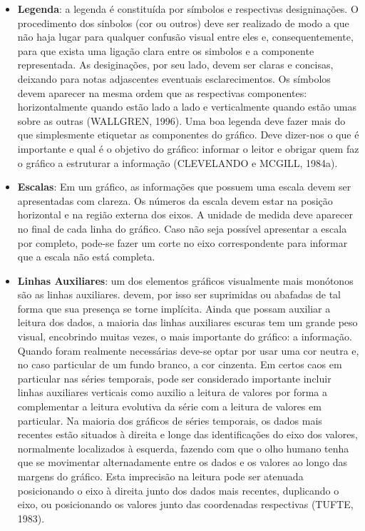 \begin{itemize}
\item \textbf{Legenda}: a legenda é constituída por símbolos e respectivas designinações. O procedimento dos sinbolos (cor ou outros) deve ser realizado de modo a que não haja lugar para qualquer confusão visual entre eles e, consequentemente, para que exista uma ligação clara entre os simbolos e a componente representada. As desiginações, por seu lado, devem ser claras e concisas, deixando para notas adjascentes eventuais esclarecimentos. Os símbolos devem aparecer na mesma ordem que as respectivas componentes: horizontalmente quando estão lado a lado e verticalmente quando estão umas sobre as outras (WALLGREN, 1996). Uma boa legenda deve fazer mais do que simplesmente etiquetar as componentes do gráfico. Deve dizer-nos o que é importante e qual é o objetivo do gráfico:   
informar o leitor e obrigar quem faz o gráfico a estruturar a informação (CLEVELANDO e MCGILL, 1984a).\vskip0.3cm

\item \textbf{Escalas}: Em um gráfico, as informações que possuem uma escala devem ser apresentadas com clareza. Os números da escala devem estar na posição horizontal e na região
externa dos eixos. A unidade de medida deve aparecer no final de cada linha do gráfico. Caso não seja possível apresentar a escala por completo, pode-se fazer um corte no eixo correspondente para informar que a escala não está completa.

\item \textbf{Linhas Auxiliares}: um dos elementos gráficos visualmente mais monótonos são as linhas auxiliares. devem, por isso ser suprimidas ou abafadas de tal forma que sua presença se torne implícita. Ainda que possam auxiliar a leitura dos dados, a maioria das linhas auxiliares escuras tem um grande peso visual, encobrindo muitas vezes, o mais importante do gráfico: a informação. Quando foram realmente necessárias deve-se optar por usar uma cor neutra e, no caso particular de um fundo branco, a cor cinzenta. Em certos caos em particular nas séries temporais, pode ser considerado importante incluir linhas auxiliares verticais como auxilio a leitura de valores por forma a complementar a leitura evolutiva da série com a leitura de valores em particular. Na maioria dos gráficos de séries temporais, os dados mais recentes estão situados à direita e longe das identificações do eixo dos valores, normalmente localizados à esquerda, fazendo com que o olho humano tenha que se movimentar alternadamente entre os dados e os valores ao longo das margens do gráfico. Esta imprecisão na leitura pode ser atenuada posicionando o eixo à direita junto dos dados mais recentes, duplicando o eixo, ou posicionando os valores junto das coordenadas respectivas (TUFTE, 1983).\vskip0.3cm


\end{itemize}
